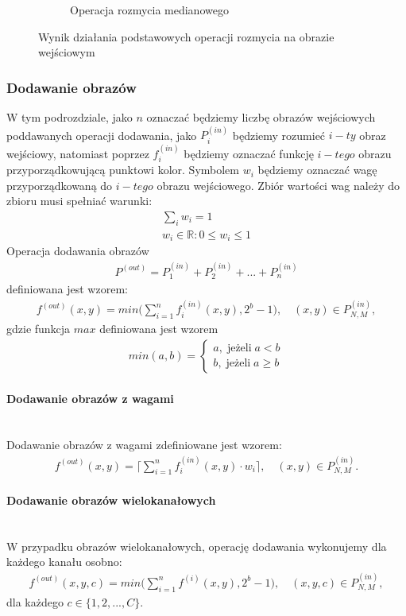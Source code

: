 \begin{figure}
\begin{subfigure}[b]{0.45\textwidth}
    \caption{Operacja rozmycia medianowego}
    \label{fig:smooth_lena_gauss}
  \end{subfigure}
  \caption{Wynik działania podstawowych operacji rozmycia na obrazie wejściowym}
  \label{fig:lena_smooth}
\end{figure}
\subsubsection{Dodawanie obrazów}
W tym podrozdziale, jako $n$ oznaczać będziemy liczbę obrazów wejściowych poddawanych operacji dodawania, jako $P^{(in)}_{i}$ będziemy rozumieć $i-ty$ obraz wejściowy, natomiast poprzez $f^{(in)}_i$ będziemy oznaczać funkcję $i-tego$ obrazu przyporządkowującą punktowi kolor. Symbolem $w_i$ będziemy oznaczać wagę przyporządkowaną do $i-tego$ obrazu wejściowego. Zbiór wartości wag należy do zbioru musi spełniać warunki:
\begin{gather*}
  \displaystyle\sum_i w_i = 1\\
  w_i \in \mathbb{R}: 0 \leqslant w_i \leqslant 1
\end{gather*}
Operacja dodawania obrazów 
\begin{gather*}
P^{(out)} = P_1^{(in)} + P_2^{(in)} + ... + P_n^{(in)}
\end{gather*}
definiowana jest wzorem:
\begin{gather*}
  f^{(out)}(x, y) = min\big(\displaystyle\sum_{i=1}^{n} f^{(in)}_i(x, y), 2^b-1\big), \quad (x, y) \in P^{(in)}_{N,M},
\end{gather*} gdzie funkcja $max$ definiowana jest wzorem
\begin{gather*}
  min(a, b) = \left\{\begin{matrix}
  a, \; \text{jeżeli} \; a < b \\
  b, \; \text{jeżeli} \; a \geqslant b
  \end{matrix}\right. 
\end{gather*}
\paragraph{Dodawanie obrazów z wagami} \mbox{}\\
Dodawanie obrazów z wagami zdefiniowane jest wzorem:
\begin{gather*}
  f^{(out)}(x, y) = \big\lceil \displaystyle\sum_{i=1}^{n} f^{(in)}_i(x, y) \cdot w_i\big\rceil, \quad (x, y) \in P^{(in)}_{N,M}.
\end{gather*}
\paragraph{Dodawanie obrazów wielokanałowych} \mbox{}\\
W przypadku obrazów wielokanałowych, operację dodawania wykonujemy dla każdego kanału osobno:
\begin{gather*}
  f^{(out)}(x, y, c) = min\big(\displaystyle\sum_{i=1}^{n} f^{(i)}(x, y), 2^b-1\big), \quad (x, y, c) \in P^{(in)}_{N,M},
\end{gather*}
dla każdego $c \in \{1, 2, ..., C\}$.
